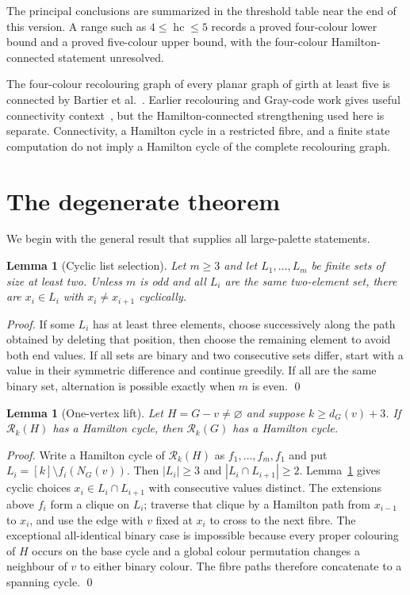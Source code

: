 \documentclass[11pt]{article}
\newtheorem{lemma}[theorem]{Lemma}
\theoremstyle{remark}
\newcommand{\Rk}{\mathcal R_k}
\newcommand{\hc}{\operatorname{hc}}
\numberwithin{equation}{section}
\numberwithin{table}{section}
\begin{document}
The principal conclusions are summarized in the threshold table near the end of this version.  A range such as $4\le\hc\le5$ records a proved four-colour lower bound and a proved five-colour upper bound, with the four-colour Hamilton-connected statement unresolved.



The four-colour recolouring graph of every planar graph of girth at least five is connected by Bartier et al.~\cite{BBFHMP23}.  Earlier recolouring and Gray-code work gives useful connectivity context~\cite{DFFV06,ChMa11}, but the Hamilton-connected strengthening used here is separate.  Connectivity, a Hamilton cycle in a restricted fibre, and a finite state computation do not imply a Hamilton cycle of the complete recolouring graph.

\section{The degenerate theorem}
\label{sec:degenerate}

We begin with the general result that supplies all large-palette statements.

\begin{lemma}[Cyclic list selection]
\label{lem:list-cycle}
Let $m\ge3$ and let $L_1,\ldots,L_m$ be finite sets of size at least two.  Unless $m$ is odd and all $L_i$ are the same two-element set, there are $x_i\in L_i$ with $x_i\ne x_{i+1}$ cyclically.
\end{lemma}

\begin{proof}
If some $L_i$ has at least three elements, choose successively along the path obtained by deleting that position, then choose the remaining element to avoid both end values.  If all sets are binary and two consecutive sets differ, start with a value in their symmetric difference and continue greedily.  If all are the same binary set, alternation is possible exactly when $m$ is even. \qed
\end{proof}

\begin{lemma}[One-vertex lift]
\label{lem:single-lift}
Let $H=G-v\ne\varnothing$ and suppose $k\ge d_G(v)+3$.  If $\Rk(H)$ has a Hamilton cycle, then $\Rk(G)$ has a Hamilton cycle.
\end{lemma}

\begin{proof}
Write a Hamilton cycle of $\Rk(H)$ as $f_1,\ldots,f_m,f_1$ and put $L_i=[k]\setminus f_i(N_G(v))$.  Then $|L_i|\ge3$ and $|L_i\cap L_{i+1}|\ge2$.  Lemma~\ref{lem:list-cycle} gives cyclic choices $x_i\in L_i\cap L_{i+1}$ with consecutive values distinct.  The extensions above $f_i$ form a clique on $L_i$; traverse that clique by a Hamilton path from $x_{i-1}$ to $x_i$, and use the edge with $v$ fixed at $x_i$ to cross to the next fibre.  The exceptional all-identical binary case is impossible because every proper colouring of $H$ occurs on the base cycle and a global colour permutation changes a neighbour of $v$ to either binary colour.  The fibre paths therefore concatenate to a spanning cycle. \qed
\end{proof}
\end{document}
